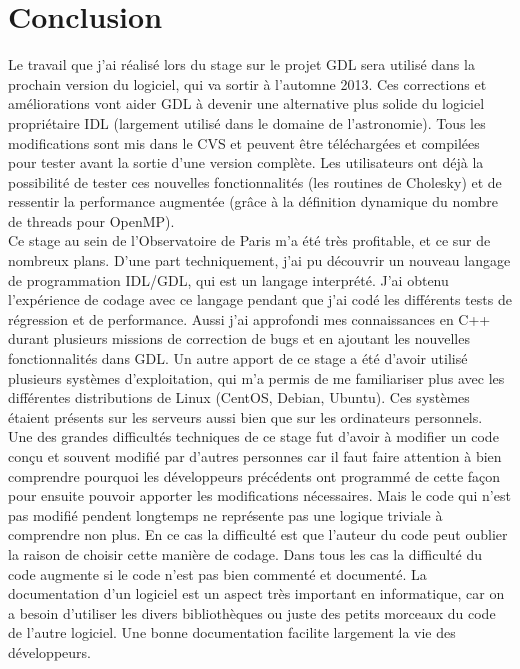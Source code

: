 \section*{Conclusion}

Le travail que j'ai réalisé lors du stage sur le projet GDL sera utilisé dans la prochain version du logiciel, qui va sortir à l'automne 2013. Ces corrections et améliorations vont aider GDL à devenir une alternative plus solide du logiciel propriétaire IDL (largement utilisé dans le domaine de l’astronomie). Tous les modifications sont mis dans le CVS et peuvent être téléchargées et compilées pour tester avant la sortie d'une version complète. Les utilisateurs ont déjà la possibilité de tester ces nouvelles fonctionnalités (les routines de Cholesky) et de ressentir la performance augmentée (grâce à la définition dynamique du nombre de threads pour OpenMP).\\

Ce stage au sein de l’Observatoire de Paris m'a été très profitable, et ce sur de nombreux plans. D'une part techniquement, j'ai pu découvrir un nouveau langage de programmation IDL/GDL, qui est un langage interprété. J'ai obtenu l’expérience de codage avec ce langage pendant que j'ai codé les différents tests de régression et de performance. Aussi j'ai approfondi mes connaissances en C++ durant plusieurs missions de correction de bugs et en ajoutant les nouvelles fonctionnalités dans GDL. Un autre apport de ce stage a été d'avoir utilisé plusieurs systèmes d'exploitation, qui m'a permis de me familiariser plus avec les différentes distributions de Linux (CentOS, Debian, Ubuntu). Ces systèmes étaient présents sur les serveurs aussi bien que sur les ordinateurs personnels.\\

Une des grandes difficultés techniques de ce stage fut d’avoir à modifier un code conçu et souvent modifié par d’autres personnes car il faut faire attention à bien comprendre pourquoi les développeurs précédents ont programmé de cette façon pour ensuite pouvoir apporter les modifications nécessaires. Mais le code qui n'est pas modifié pendent longtemps ne représente pas une logique triviale à comprendre non plus. En ce cas la difficulté est que l'auteur du code peut oublier la raison de choisir cette manière de codage. Dans tous les cas la difficulté du code augmente si le code n'est pas bien commenté et documenté. La documentation d'un logiciel est un aspect très important en informatique, car on a besoin d'utiliser les divers bibliothèques ou juste des petits morceaux du code de l'autre logiciel. Une bonne documentation facilite largement la vie des développeurs.\\  \\ \\

